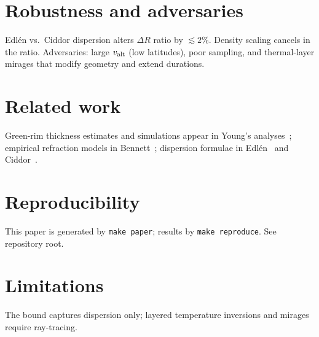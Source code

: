 \documentclass[11pt]{article}
\begin{document}
\section{Robustness and adversaries}
Edl\'en vs.\ Ciddor dispersion alters $\Delta R$ ratio by $\lesssim 2\%$. Density scaling cancels in the ratio. Adversaries: large $v_{\rm alt}$ (low latitudes), poor sampling, and thermal-layer mirages that modify geometry and extend durations.

\section{Related work}
Green-rim thickness estimates and simulations appear in Young's analyses~\cite{YoungJOSA,YoungSim};
empirical refraction models in Bennett~\cite{Bennett1982};
dispersion formulae in Edl\'en~\cite{Edlen1966} and Ciddor~\cite{Ciddor1996}.

\section{Reproducibility}
This paper is generated by \texttt{make paper}; results by \texttt{make reproduce}. See repository root.

\section{Limitations}
The bound captures dispersion only; layered temperature inversions and mirages require ray-tracing.

\nocite{Ciddor1996,Edlen1966,Bennett1982,YoungJOSA,YoungSim}


\end{document}
